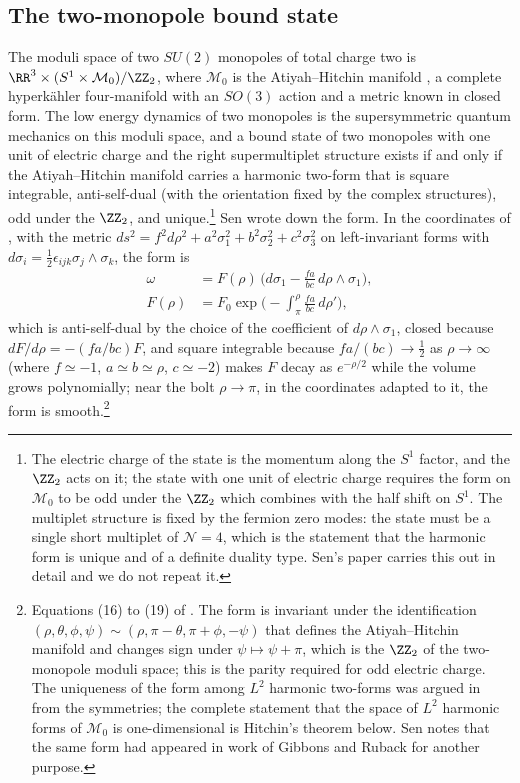 \subsection{The two-monopole bound state}\label{ssec:twomonopole}

The moduli space of two $SU(2)$ monopoles of total charge two is $\RR^3\times (S^1\times \mathcal M_0)/\ZZ_2$, where $\mathcal M_0$ is the Atiyah--Hitchin manifold \cite{AtiyahHitchin88}, a complete hyperk\"ahler four-manifold with an $SO(3)$ action and a metric known in closed form. The low energy dynamics of two monopoles is the supersymmetric quantum mechanics on this moduli space, and a bound state of two monopoles with one unit of electric charge and the right supermultiplet structure exists if and only if the Atiyah--Hitchin manifold carries a harmonic two-form that is square integrable, anti-self-dual (with the orientation fixed by the complex structures), odd under the $\ZZ_2$, and unique.\footnote{The electric charge of the state is the momentum along the $S^1$ factor, and the $\ZZ_2$ acts on it; the state with one unit of electric charge requires the form on $\mathcal M_0$ to be odd under the $\ZZ_2$ which combines with the half shift on $S^1$. The multiplet structure is fixed by the fermion zero modes: the state must be a single short multiplet of $\mathcal N=4$, which is the statement that the harmonic form is unique and of a definite duality type. Sen's paper carries this out in detail and we do not repeat it.} Sen wrote down the form. In the coordinates of \cite{AtiyahHitchin88}, with the metric $ds^2 = f^2 d\rho^2 + a^2\sigma_1^2 + b^2\sigma_2^2 + c^2\sigma_3^2$ on left-invariant forms with $d\sigma_i = \tfrac12\epsilon_{ijk}\sigma_j\wedge\sigma_k$, the form is
\begin{equation}\label{eq:senform}
\begin{aligned}
\omega &= F(\rho)\,\Big(d\sigma_1 - \frac{fa}{bc}\, d\rho\wedge\sigma_1\Big),\\
F(\rho) &= F_0\exp\Big(-\int_{\pi}^{\rho}\frac{fa}{bc}\,d\rho'\Big),
\end{aligned}
\end{equation}
which is anti-self-dual by the choice of the coefficient of $d\rho\wedge\sigma_1$, closed because $dF/d\rho = -(fa/bc)F$, and square integrable because $fa/(bc)\to\tfrac12$ as $\rho\to\infty$ (where $f\simeq -1$, $a\simeq b\simeq\rho$, $c\simeq -2$) makes $F$ decay as $e^{-\rho/2}$ while the volume grows polynomially; near the bolt $\rho\to\pi$, in the coordinates adapted to it, the form is smooth.\footnote{Equations (16) to (19) of \cite{Sen94dyon}. The form is invariant under the identification $(\rho,\theta,\phi,\psi)\sim(\rho,\pi-\theta,\pi+\phi,-\psi)$ that defines the Atiyah--Hitchin manifold and changes sign under $\psi\mapsto\psi+\pi$, which is the $\ZZ_2$ of the two-monopole moduli space; this is the parity required for odd electric charge. The uniqueness of the form among $L^2$ harmonic two-forms was argued in \cite{Sen94dyon} from the symmetries; the complete statement that the space of $L^2$ harmonic forms of $\mathcal M_0$ is one-dimensional is Hitchin's theorem below. Sen notes that the same form had appeared in work of Gibbons and Ruback for another purpose.}


